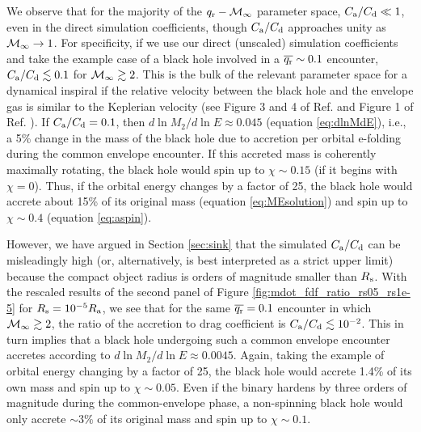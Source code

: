 We observe that for the majority of the $q_{\rm r}-{\cal M}_\infty$ parameter space, $C_{\rm a}/C_{\rm d} \ll 1$, even in the direct simulation coefficients, though $C_{\rm a}/C_{\rm d}$ approaches unity as ${\cal M}_\infty\rightarrow1$. For specificity, if we use our direct (unscaled) simulation coefficients and take the example case of a black hole involved in a $\overline{q_{\rm r}}\sim 0.1$ encounter, $C_{\rm a}/C_{\rm d} \lesssim 0.1$ for ${\cal M}_\infty \gtrsim 2$.  This is the bulk of the relevant parameter space for a dynamical inspiral if the relative velocity between the black hole and the envelope gas is similar to the Keplerian velocity (see Figure 3 and 4 of Ref. \cite{MacLeod_2015} and Figure 1 of Ref. \cite{MacLeod:2017}). If $C_{\rm a}/C_{\rm d}=0.1$, then $d\ln M_2 / d\ln E \approx 0.045$ (equation \eqref{eq:dlnMdE}), i.e., a 5\% change in the mass of the black hole due to accretion per orbital e-folding during the common envelope encounter. If this accreted mass is coherently maximally rotating, the black hole would spin up to $\chi\sim 0.15$ (if it begins with $\chi=0$). Thus, if the orbital energy changes by a factor of 25, the black hole would accrete about 15\% of its original mass (equation \eqref{eq:MEsolution}) and spin up to $\chi\sim 0.4$ (equation \eqref{eq:aspin}).

However, we have argued in Section \ref{sec:sink} that the simulated $C_{\rm a}/C_{\rm d}$ can be misleadingly high (or, alternatively, is best interpreted as a strict upper limit) because the compact object radius is orders of magnitude smaller than $R_{\rm s}$. With the rescaled results of the second panel of Figure \ref{fig:mdot_fdf_ratio_rs05_rs1e-5} for $R_{\rm s} = 10^{-5} R_{\rm a}$, we see that for the same $\overline{q_{\rm r}}=0.1$ encounter in which ${\cal M}_\infty \gtrsim 2$, the ratio of the accretion to drag coefficient is $C_{\rm a}/C_{\rm d} \lesssim 10^{-2}$. This in turn implies that a black hole undergoing such a common envelope encounter accretes according to $d\ln M_2 / d\ln E \approx 0.0045$. Again, taking the example of orbital energy changing by a factor of 25, the black hole would accrete 1.4\% of its own mass and spin up to $\chi \sim 0.05$.  Even if the binary hardens by three orders of magnitude during the common-envelope phase, a non-spinning black hole would only accrete $\sim 3\%$ of its original mass and spin up to $\chi \sim 0.1$.

